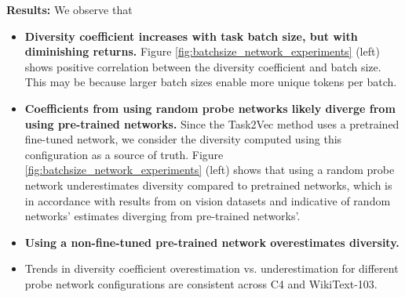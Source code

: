 \documentclass[10pt]{article} %
\begin{document}
\textbf{Results:} We observe that
\begin{itemize} %
    \item \textbf{Diversity coefficient increases with task batch size, but with diminishing returns.} 
    Figure \ref{fig:batchsize_network_experiments} (left) shows positive correlation between the diversity coefficient and batch size. 
    This may be because larger batch sizes enable more unique tokens per batch.
    \item \textbf{Coefficients from using random probe networks likely diverge from using pre-trained networks.} 
    Since the Task2Vec method \citep{task2vec} uses a pretrained fine-tuned network, we consider the diversity computed using this configuration as a source of truth. 
    Figure \ref{fig:batchsize_network_experiments} (left) shows that using a random probe network underestimates diversity compared to pretrained networks, which is in accordance with results from \cite{diversity} on vision datasets and indicative of random networks' estimates diverging from pre-trained networks'. 
    \item \textbf{Using a non-fine-tuned pre-trained network overestimates diversity.} 
    \item Trends in diversity coefficient overestimation vs. underestimation for different probe network configurations are consistent across C4 and WikiText-103.
\end{itemize}
\end{document}
